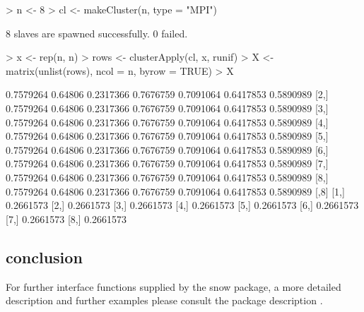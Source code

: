 \begin{Schunk}
\begin{Sinput}
> n <- 8
> cl <- makeCluster(n, type = "MPI")
\end{Sinput}
\begin{Soutput}
	8 slaves are spawned successfully. 0 failed.
\end{Soutput}
\begin{Sinput}
> x <- rep(n, n)
> rows <- clusterApply(cl, x, runif)
> X <- matrix(unlist(rows), ncol = n, byrow = TRUE)
> X
\end{Sinput}
\begin{Soutput}
          [,1]    [,2]      [,3]      [,4]      [,5]      [,6]      [,7]
[1,] 0.7579264 0.64806 0.2317366 0.7676759 0.7091064 0.6417853 0.5890989
[2,] 0.7579264 0.64806 0.2317366 0.7676759 0.7091064 0.6417853 0.5890989
[3,] 0.7579264 0.64806 0.2317366 0.7676759 0.7091064 0.6417853 0.5890989
[4,] 0.7579264 0.64806 0.2317366 0.7676759 0.7091064 0.6417853 0.5890989
[5,] 0.7579264 0.64806 0.2317366 0.7676759 0.7091064 0.6417853 0.5890989
[6,] 0.7579264 0.64806 0.2317366 0.7676759 0.7091064 0.6417853 0.5890989
[7,] 0.7579264 0.64806 0.2317366 0.7676759 0.7091064 0.6417853 0.5890989
[8,] 0.7579264 0.64806 0.2317366 0.7676759 0.7091064 0.6417853 0.5890989
          [,8]
[1,] 0.2661573
[2,] 0.2661573
[3,] 0.2661573
[4,] 0.2661573
[5,] 0.2661573
[6,] 0.2661573
[7,] 0.2661573
[8,] 0.2661573
\end{Soutput}
\end{Schunk}



\subsection{conclusion}


For further interface functions supplied by the snow package, a more detailed
description and further examples please consult the package description
\cite{tierney07snow}.

